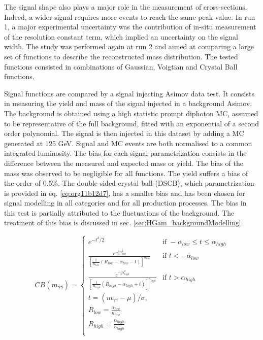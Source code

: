The signal shape also plays a major role in the measurement of cross-sections.
Indeed, a wider signal requires more events to reach the same peak value.
In run 1, a major experimental uncertainty was the contribution of in-situ measurement of the resolution constant term, which implied an uncertainty on the signal width.
The study was performed again at run 2 and aimed at comparing a large set of functions to describe the reconstructed mass distribution.
The tested functions consisted in combinations of Gaussian, Voigtian and Crystal Ball functions.

Signal functions are compared by a signal injecting Asimov data test.
It consists in measuring the yield and mass of the signal injected in a background Asimov.
The background is obtained using a high statistic prompt diphoton MC, assumed to be representative of the full background, fitted with an exponential of a second order polynomial.
The signal is then injected in this dataset by adding a MC generated at 125 GeV.
Signal and MC events are both normalised to a common integrated luminosity.
The bias for each signal parametrization consists in the difference between the measured and expected mass or yield.
The bias of the mass was observed to be negligible for all functions.
The yield suffers a bias of the order of 0.5\%.
The double sided crystal ball (DSCB), which parametrization is provided in eq. \ref{eq:org11b12d7}, has a smaller bias and has been chosen for signal modelling in all categories and for all production processes.
The bias in this test is partially attributed to the fluctuations of the background.
The treatment of this bias is discussed in sec. \ref{sec:HGam_backgroundModelling}.

\begin{equation}
CB(m_{\gamma \gamma}) =
\begin{cases}
e^{-t^{2}/2} & \text{if } -\alpha_{low} \leq t \leq \alpha_{high} \\
\frac{ e^{-{}^{1}_{2} \alpha_{low}^{2}} } { \left[ \frac{1}{R_{low}} \left(R_{low} - \alpha_{low} - t \right) \right]^{n_{low}} } & \text{if } t < -\alpha_{low} \\
\frac{ e^{-{}^{1}_{2} \alpha_{high}^{2}} } { \left[ \frac{1}{R_{high}} \left(R_{high} - \alpha_{high} + t \right) \right]^{n_{high}} } & \text{if } t > \alpha_{high} \\
t=(m_{\gamma\gamma}-\mu)/\sigma,
\\
R_{low}=\frac{\alpha_{low}}{n_{low}}\\
R_{high}=\frac{\alpha_{high}}{n_{high}} \\
\end{cases}
\label{eq:org11b12d7}
\end{equation}

